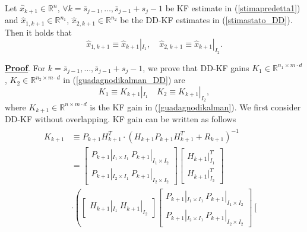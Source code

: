 \documentclass[smallcondensed]{svjour3}
\begin{document}
\begin{theorem}\label{propeq}
 
 Let $\widehat{x}_{k+1}\in \mathbb{R}^{n}$, $\forall k=\bar{s}_{j-1},\ldots,\bar{s}_{j-1}+s_{j}-1$ be  KF estimate in (\ref{stimapredetta1}) and $\widehat{x}_{1,k+1}\in \mathbb{R}^{n_{1}}$, $\widehat{x}_{2,k+1}\in \mathbb{R}^{n_{2}}$ be the DD-KF estimates in (\ref{stimastato_DD}). Then it holds that
\begin{equation}\label{equiv1}
\widehat{x}_{1,k+1}\equiv \widehat{x}_{k+1}|_{I_{1}}, \quad \widehat{x}_{2,k+1}\equiv \widehat{x}_{k+1}|_{I_{2}}. 
\end{equation}
\end{theorem}
\noindent \underline{\bf Proof}.
{\footnotesize 
For $k=\bar{s}_{j-1},\ldots,\bar{s}_{j-1}+s_{j}-1$, we prove that  DD-KF gains $K_{1}\in \mathbb{R}^{n_{1}\times  m\cdot d}$, $K_{2}\in \mathbb{R}^{n_{2}\times  m\cdot d}$ in (\ref{guadagnodikalman_DD}) are
\begin{equation}\label{equivalenza}
K_{1}\equiv K_{k+1}|_{I_{1}} \quad K_{2}\equiv K_{k+1}|_{I_{2}},
\end{equation}
where $K_{k+1}\in \mathbb{R}^{n\times m\cdot d}$ is the KF gain in (\ref{guadagnodikalman}). We first consider DD-KF without overlapping. KF gain can be written as follows
{\footnotesize
\begin{equation}\label{KFgain}
\begin{array}{ll}
\begin{array}{ll}
K_{k+1}&\equiv P_{k+1}H_{k+1}^{T}\cdot (H_{k+1}P_{k+1}H_{k+1}^{T}+R_{k+1})^{-1}\\ &=\left[\begin{array}{ll}
P_{k+1}|_{I_{1}\times I_{1}} \ P_{k+1}|_{I_1\times I_2}\\ P_{k+1}|_{I_2\times I_1}\ P_{k+1}|_{I_{2}\times I_{2}} 
\end{array}\right]\left[\begin{array}{ll} H_{k+1}|_{I_{1}}^{T}\\
H_{k+1}|_{I_2}^{T}\end{array}\right]
\\
&\cdot\left(\left[\begin{array}{ll}
H_{k+1}|_{I_{1}}\ H_{k+1}|_{I_{2}}
\end{array}\right]\left[\begin{array}{ll}
P_{k+1}|_{I_{1}\times I_{1}} \ P_{k+1}|_{I_{1}\times I_{2}}\\
 P_{k+1}|_{I_{2}\times I_{1}}\ P_{k+1}|_{I_{2}\times I_{2}} 
\end{array}\right]\left[\begin{array}{ll}

\end{array}
\end{array}
\end{array}
\end{equation}}}
\end{document}
